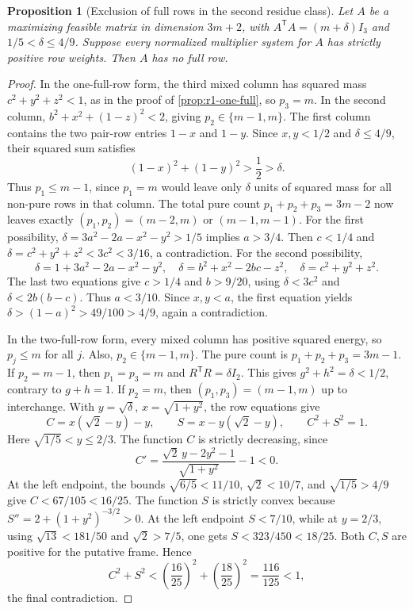 \documentclass[11pt]{article}
\numberwithin{equation}{section}
\newtheorem{proposition}[proposition]{Proposition}
\theoremstyle{definition}
\theoremstyle{definition}
\begin{document}
\begin{proposition}[Exclusion of full rows in the second residue class]
\label{prop:r2-full-exclusion}
Let $A$ be a maximizing feasible matrix in dimension $3m+2$,
with $A^{\mathsf T}A=(m+\delta)I_3$ and
$1/5<\delta\le4/9$.  Suppose every normalized multiplier system for
$A$ has strictly positive row weights.  Then $A$ has no full row.
\end{proposition}
\begin{proof}
In the one-full-row form, the third mixed column has squared mass
$c^2+y^2+z^2<1$, as in the proof of
\cref{prop:r1-one-full}, so $p_3=m$. In the second column,
$b^2+x^2+(1-z)^2<2$, giving $p_2\in\{m-1,m\}$.
The first column contains the two pair-row entries $1-x$ and $1-y$.
Since $x,y<1/2$ and $\delta\le4/9$, their squared sum satisfies
\[
 (1-x)^2+(1-y)^2>\frac12>\delta.
\]
Thus $p_1\le m-1$, since $p_1=m$ would leave only $\delta$
units of squared mass for all non-pure rows in that column.
The total pure count $p_1+p_2+p_3=3m-2$ now leaves exactly
$(p_1,p_2)=(m-2,m)$ or $(m-1,m-1)$.
For the first possibility,
$\delta=3a^2-2a-x^2-y^2>1/5$ implies $a>3/4$.
Then $c<1/4$ and
$\delta=c^2+y^2+z^2<3c^2<3/16$, a contradiction.
For the second possibility,
\[
 \delta=1+3a^2-2a-x^2-y^2,
 \quad \delta=b^2+x^2-2bc-z^2,
 \quad \delta=c^2+y^2+z^2.
\]
The last two equations give $c>1/4$ and $b>9/20$, using
$\delta<3c^2$ and $\delta<2b(b-c)$.
Thus $a<3/10$.  Since $x,y<a$, the first equation yields
$\delta>(1-a)^2>49/100>4/9$, again a contradiction.

In the two-full-row form, every mixed column has positive squared
energy, so $p_j\le m$ for all $j$. Also, $p_2\in\{m-1,m\}$.
The pure count is $p_1+p_2+p_3=3m-1$.
If $p_2=m-1$, then $p_1=p_3=m$ and
$R^{\mathsf T}R=\delta I_2$.  This gives
$g^2+h^2=\delta<1/2$, contrary to $g+h=1$.
If $p_2=m$, then $(p_1,p_3)=(m-1,m)$ up to interchange.
With $y=\sqrt\delta$, $x=\sqrt{1+y^2}$, the row equations give
\[
 C=x(\sqrt2-y)-y,\qquad S=x-y(\sqrt2-y),\qquad C^2+S^2=1.
\]
Here $\sqrt{1/5}<y\le2/3$.  The function $C$ is strictly decreasing,
since
\[
 C'=\frac{\sqrt2\,y-2y^2-1}{\sqrt{1+y^2}}-1<0.
\]
At the left endpoint, the bounds
$\sqrt{6/5}<11/10$, $\sqrt2<10/7$, and $\sqrt{1/5}>4/9$
give $C<67/105<16/25$.
The function $S$ is strictly convex because
$S''=2+(1+y^2)^{-3/2}>0$.
At the left endpoint $S<7/10$, while at $y=2/3$,
using $\sqrt{13}<181/50$ and $\sqrt2>7/5$, one gets
$S<323/450<18/25$.
Both $C,S$ are positive for the putative frame.  Hence
\[
 C^2+S^2<\left(\frac{16}{25}\right)^2+
                 \left(\frac{18}{25}\right)^2
          =\frac{116}{125}<1,
\]
the final contradiction.
\end{proof}
\end{document}
